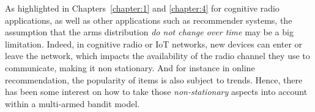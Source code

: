 

%

As highlighted in Chapters~\ref{chapter:1} and \ref{chapter:4} for cognitive radio applications, as well as other applications such as recommender systems, the assumption that the arms distribution \emph{do not change over time} may be a big limitation.
Indeed, in cognitive radio or IoT networks, new devices can enter or leave the network, which impacts the availability of the radio channel they use to communicate, making it non stationary.
And for instance in online recommendation, the popularity of items is also subject to trends.
Hence, there has been some interest on how to take those \emph{non-stationary} aspects into account within a multi-armed bandit model.

